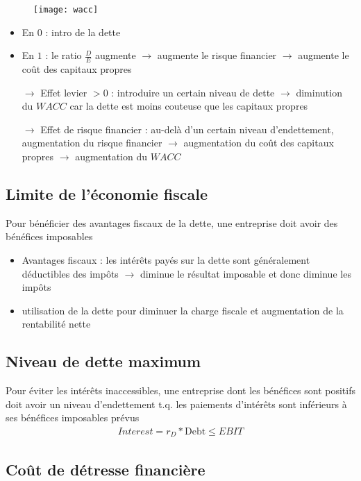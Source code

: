 \begin{figure}[H]
    \centering
    \texttt{[image: wacc]}
\end{figure}
\begin{itemize}
    \item En $0$ : intro de la dette
    \item En $1$ : le ratio $\frac{D}{E}$ augmente $\rightarrow$ augmente le risque financier $\rightarrow$ augmente le coût des capitaux propres
    \item[$\rightarrow$] Effet levier $> 0$ : introduire un certain niveau de dette $\rightarrow$ diminution du $WACC$ car la dette est moins couteuse que les capitaux propres
    \item[$\rightarrow$] Effet de risque financier : au-delà d'un certain niveau d'endettement, augmentation du risque financier $\rightarrow$ augmentation du coût des capitaux propres $\rightarrow$ augmentation du $WACC$
\end{itemize}

\subsection{Limite de l'économie fiscale}

Pour bénéficier des avantages fiscaux de la dette, une entreprise doit avoir des bénéfices imposables
\begin{itemize}
    \item Avantages fiscaux : les intérêts payés sur la dette sont généralement déductibles des impôts $\rightarrow$ diminue le résultat imposable et donc diminue les impôts
    \item utilisation de la dette pour diminuer la charge fiscale et augmentation de la rentabilité nette
\end{itemize}

\subsection{Niveau de dette maximum}

Pour éviter les intérêts inaccessibles, une entreprise dont les bénéfices sont positifs doit avoir un niveau d'endettement t.q. les paiements d'intérêts sont inférieurs à ses bénéfices imposables prévus
\begin{align*}
    Interest = r_D * \text{Debt} \leq EBIT
\end{align*}

\subsection{Coût de détresse financière}

